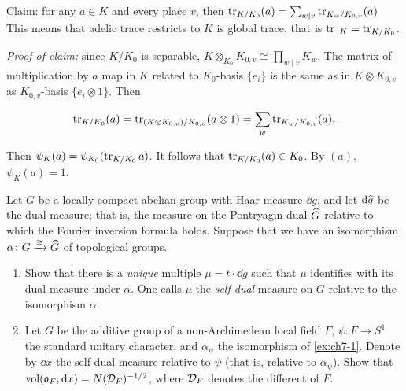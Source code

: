 \begin{solution}
  Claim: for any $a \in K$ and every place $v$, then
  $\operatorname{tr}_{K/ K_0} (a) = \sum_{w \mid v} \operatorname{tr}_{K_w/ K_{0, v}} (a)$
  This means that adelic trace restricts to $K$ is global trace,
  that is $\operatorname{tr} |_K = \operatorname{tr}_{K/K_0}$.

  \textit{Proof of claim:} since $K/ K_0$ is separable,
  $K \otimes_{K_0} K_{0, v} \cong \prod_{w \mid v} K_w$.
  The matrix of multiplication by $a$ map in $K$ related to
  $K_0$-basis $\{e_i\}$ is the same as in $K \otimes K_{0, v}$
  as $K_{0, v}$-basis $\{e_i \otimes 1\}$.
  Then

  \[\operatorname{tr}_{K/K_0} (a) = \operatorname{tr}_{(K \otimes K_{0, v})/ K_{0, v}} (a \otimes 1) =
    \sum_{w} \operatorname{tr}_{K_w/ K_{0, v}} (a).  \]

  Then $\psi_K(a) = \psi_{K_0} (\operatorname{tr}_{K/ K_0} a)$. It follows that
  $\operatorname{tr}_{K/K_0} (a) \in K_0$. By $(a)$, $\psi_K (a) = 1$.

\end{solution}

\begin{exercise}[7]
  \label{ex:ch7-7}
  Let $G$ be a locally compact abelian group with Haar measure $\dd g$, and
  let $\mathop{}\!\mathrm{d}\widehat{g}$ be the dual measure; that is, the measure on the
  Pontryagin dual $\widehat{G}$ relative to which the Fourier inversion formula
  holds. Suppose that we have an isomorphism
  $\alpha \colon G \xrightarrow{\cong} \widehat{G}$ of topological groups.
  \begin{enumerate}[label=(\alph*)]
    \item Show that there is a \emph{unique} multiple $\mu = t \cdot \dd g$
      such that $\mu$ identifies with its dual measure under $\alpha$. One
      calls $\mu$ the \emph{self-dual} measure on $G$ relative to the
      isomorphism $\alpha$.
    \item Let $G$ be the additive group of a non-Archimedean local field $F$,
      $\psi \colon F \to S^1$ the standard unitary character, and
      $\alpha_\psi$ the isomorphism of \cref{ex:ch7-1}. Denote by $\dd x$ the
      self-dual measure relative to $\psi$ (that is, relative to
      $\alpha_\psi$). Show that $\operatorname{vol}(\mathfrak{o}_F, \mathop{}\!\mathrm{d} x) = N(\mathcal{D}_F)^{-1/2}$,
      where $\mathcal{D}_F$ denotes the different of $F$.
  \end{enumerate}
\end{exercise}

